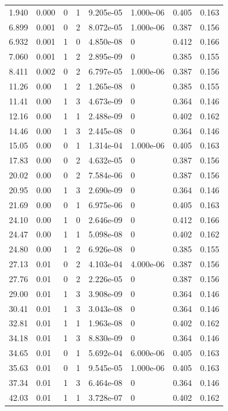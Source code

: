 \documentclass[preview]{standalone}
\begin{document}
{{\begin{tabular}{L{1.2cm}C{1.2cm} C{0.3cm}C{0.5cm} C{1.4cm}C{1.4cm} C{1.4cm}C{1.4cm}}
  1.940  &  0.000  & 0     &  1 &  9.205e-05  & 1.000e-06  & 0.405 &  0.163   \\ 
  6.899  &  0.001  & 0     &  2 &  8.072e-05  & 1.000e-06  & 0.387 &  0.156   \\ 
  6.932  &  0.001  & 1     &  0 &  4.850e-08  & 0  & 0.412 &  0.166   \\ 
  7.060  &  0.001  & 1     &  2 &  2.895e-09  & 0  & 0.385 &  0.155   \\ 
  8.411  &  0.002  & 0     &  2 &  6.797e-05  & 1.000e-06  & 0.387 &  0.156   \\ 
  11.26  &  0.00  & 1     &  2 &  1.265e-08  & 0  & 0.385 &  0.155   \\ 
  11.41  &  0.00  & 1     &  3 &  4.673e-09  & 0  & 0.364 &  0.146   \\ 
  12.16  &  0.00  & 1     &  1 &  2.488e-09  & 0  & 0.402 &  0.162   \\ 
  14.46  &  0.00  & 1     &  3 &  2.445e-08  & 0  & 0.364 &  0.146   \\ 
  15.05  &  0.00  & 0     &  1 &  1.314e-04  & 1.000e-06  & 0.405 &  0.163   \\ 
  17.83  &  0.00  & 0     &  2 &  4.632e-05  & 0  & 0.387 &  0.156   \\ 
  20.02  &  0.00  & 0     &  2 &  7.584e-06  & 0  & 0.387 &  0.156   \\ 
  20.95  &  0.00  & 1     &  3 &  2.690e-09  & 0  & 0.364 &  0.146   \\ 
  21.69  &  0.00  & 0     &  1 &  6.975e-06  & 0  & 0.405 &  0.163   \\ 
  24.10  &  0.00  & 1     &  0 &  2.646e-09  & 0  & 0.412 &  0.166   \\ 
  24.47  &  0.00  & 1     &  1 &  5.098e-08  & 0  & 0.402 &  0.162   \\ 
  24.80  &  0.00  & 1     &  2 &  6.926e-08  & 0  & 0.385 &  0.155   \\ 
  27.13  &  0.01  & 0     &  2 &  4.103e-04  & 4.000e-06  & 0.387 &  0.156   \\ 
  27.76  &  0.01  & 0     &  2 &  2.226e-05  & 0  & 0.387 &  0.156   \\ 
  29.00  &  0.01  & 1     &  3 &  3.908e-09  & 0  & 0.364 &  0.146   \\ 
  30.41  &  0.01  & 1     &  3 &  3.043e-08  & 0  & 0.364 &  0.146   \\ 
  32.81  &  0.01  & 1     &  1 &  1.963e-08  & 0  & 0.402 &  0.162   \\ 
  34.18  &  0.01  & 1     &  3 &  8.830e-09  & 0  & 0.364 &  0.146   \\ 
  34.65  &  0.01  & 0     &  1 &  5.692e-04  & 6.000e-06  & 0.405 &  0.163   \\ 
  35.63  &  0.01  & 0     &  1 &  9.545e-05  & 1.000e-06  & 0.405 &  0.163   \\ 
  37.34  &  0.01  & 1     &  3 &  6.464e-08  & 0  & 0.364 &  0.146   \\ 
  42.03  &  0.01  & 1     &  1 &  3.728e-07  & 0  & 0.402 &  0.162   \\ 
\hline 
\end{tabular} 

}}
\end{document}
